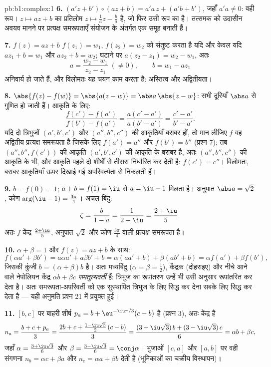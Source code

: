 \begin{solution}{pb:b1:complex:1}
\textbf{6.} $(a'z + b') \circ (az + b) = a'a\,z + (a'b + b')$, जहाँ $a'a
\neq 0$: वही रूप। $z \mapsto az + b$ का प्रतिलोम $z \mapsto \frac1a z -
\frac ba$ है, जो फिर उसी रूप का है। तत्समक  को उदासीन अवयव मानने
पर प्रत्यक्ष समरूपताएँ संयोजन के अंतर्गत एक समूह बनाती हैं।

\textbf{7.} $f(z) = az + b$ $f(z_1) = w_1$, $f(z_2) = w_2$ को संतुष्ट करता
है यदि और केवल यदि $a z_1 + b = w_1$ और $a z_2 + b = w_2$; घटाने पर $a(z_2 -
z_1) = w_2 - w_1$, अतः
\[
a = \frac{w_2 - w_1}{z_2 - z_1} \;(\neq 0), \qquad
b = w_1 - a z_1
\]
अनिवार्य हो जाते हैं, और विलोमतः यह चयन काम करता है: अस्तित्व और अद्वितीयता।

\textbf{8.} $\abs{f(z) - f(w)} = \abs{a(z - w)} = \abs a\,\abs{z - w}$: सभी
दूरियाँ $\abs a$ से गुणित हो जाती हैं। आकृति के लिए:
\[
\frac{f(c') - f(a')}{f(b') - f(a')} = \frac{a(c' -
a')}{a(b' - a')} = \frac{c' - a'}{b' - a'} .
\]
यदि दो त्रिभुजों $(a', b', c')$ और $(a'', b'', c'')$ की आकृतियाँ बराबर हों,
तो मान लीजिए $f$ वह अद्वितीय प्रत्यक्ष समरूपता है जिसके लिए $f(a') = a''$ और
$f(b') = b''$ (प्रश्न 7); तब $(a'', b'', f(c'))$ की आकृति $(a', b', c')$ की
आकृति के बराबर है, अतः $(a'', b'', c'')$ की आकृति के भी, और आकृति पहले दो
शीर्षों से तीसरा निर्धारित कर देती है: $f(c') = c''$। विलोमतः, बराबर
आकृतियाँ ऊपर दिखाई गई अपरिवर्त्यता से निकलती हैं।

\textbf{9.} $b = f(0) = 1$; $a + b = f(1) = \iu$ से $a = \iu - 1$ मिलता है।
अनुपात $\abs a = \sqrt2$, कोण $\arg(\iu - 1) = \frac{3\pi}4$। अचल बिंदु:
\[
\zeta = \frac{b}{1 - a} = \frac1{2 - \iu} = \frac{2 + \iu}5 .
\]
अतः $f$ केंद्र $\frac{2+\iu}5$, अनुपात $\sqrt2$ और कोण $\frac{3\pi}4$ वाली
प्रत्यक्ष समरूपता है।

\textbf{10.} $\alpha + \beta = 1$ और $f(z) = az + b$ के साथ:
\[
f(\alpha a' + \beta b') = a\alpha a' + a\beta b' + b
= \alpha(a a' + b) + \beta(a b' + b)
= \alpha f(a') + \beta f(b') ,
\]
जिसकी कुंजी $b = (\alpha + \beta)b$ है। अतः मध्यबिंदु ($\alpha = \beta =
\frac12$), केंद्रक (दोहराइए) और नीचे आने वाले नेपोलियन केंद्र $\alpha b +
\beta c$ \emph{समतुल्यवर्ती} हैं: त्रिभुज का रूपांतरण उन्हें भी उसी अनुसार
रूपांतरित कर देता है। अतः समरूपता-अपरिवर्ती  को एक सुस्थापित त्रिभुज के
लिए सिद्ध कर देना सबके लिए सिद्ध कर देता है --- यही अनुमति प्रश्न 21 में
प्रयुक्त हुई।

\textbf{11.} $[b, c]$ पर बाहरी शीर्ष $p_a = b + \eu^{-\iu\pi/3}(c - b)$ है
(प्रश्न 3), अतः केंद्र है
\[
n_a = \frac{b + c + p_a}3
= \frac{2b + c + \frac{1 - \iu\sqrt3}2\,(c - b)}3
= \frac{(3 + \iu\sqrt3)\,b + (3 - \iu\sqrt3)\,c}6
= \alpha b + \beta c ,
\]
जहाँ $\alpha = \frac{3 + \iu\sqrt3}6$ और $\beta = \frac{3 - \iu\sqrt3}6 =
\conj\alpha$। भुजाओं $[c, a]$ और $[a, b]$ पर वही संगणना $n_b = \alpha c +
\beta a$ और $n_c = \alpha a + \beta b$ देती है (भूमिकाओं का चक्रीय
विस्थापन)।


\end{solution}
